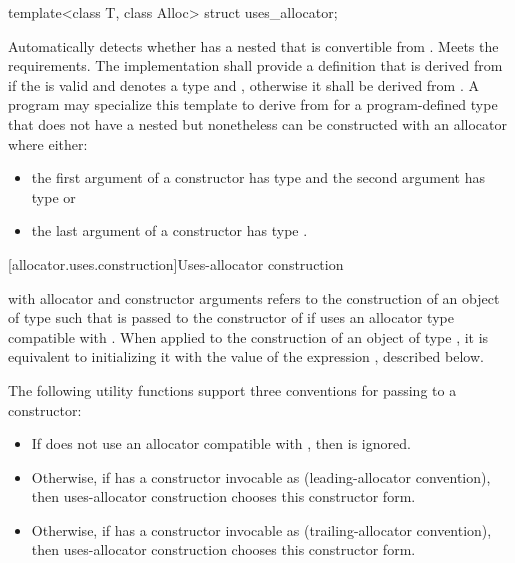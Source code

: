 %
\begin{itemdecl}
template<class T, class Alloc> struct uses_allocator;
\end{itemdecl}

\begin{itemdescr}
\pnum
\remarks
Automatically detects whether  has a nested  that
is convertible from . Meets the 
requirements. The implementation shall provide a definition that is
derived from  if the  
is valid and denotes a type and
, otherwise it shall be
derived from . A program may specialize this template to derive from
 for a program-defined type  that does not have a nested
 but nonetheless can be constructed with an allocator where
either:
\begin{itemize}
\item the first argument of a constructor has type  and the
second argument has type  or

\item the last argument of a constructor has type .
\end{itemize}
\end{itemdescr}

[allocator.uses.construction]{Uses-allocator construction}

\pnum
{}
with allocator  and constructor arguments 
refers to the construction of an object of type 
such that  is passed to the constructor of 
if  uses an allocator type compatible with .
When applied to the construction of an object of type ,
it is equivalent to initializing it with the value of the expression
, described below.

\pnum
The following utility functions support
three conventions for passing  to a constructor:
\begin{itemize}
\item
  If  does not use an allocator compatible with ,
  then  is ignored.
\item
  Otherwise, if  has a constructor invocable as
   (leading-allocator convention),
  then uses-allocator construction chooses this constructor form.
\item
  Otherwise, if  has a constructor invocable as
   (trailing-allocator convention),
  then uses-allocator construction chooses this constructor form.
\end{itemize}

